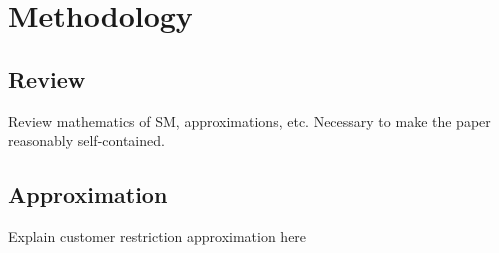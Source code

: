 \section{Methodology}
\label{section:methodology}

\subsection{Review}
Review mathematics of SM, approximations, etc.  Necessary to make the paper reasonably self-contained.

\subsection{Approximation}
Explain customer restriction approximation here